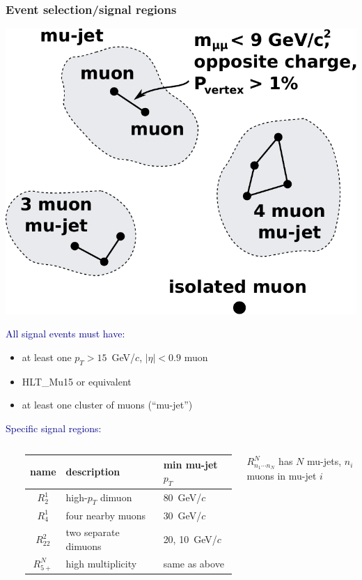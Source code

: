 \documentclass[compress]{beamer}
\begin{document}
\begin{frame}
\frametitle{Event selection/signal regions}

\vspace{0.25 cm}
\hfill \mbox{\includegraphics[width=0.37\linewidth]{closeness.pdf}\hspace{-0.6 cm}}

\vspace{-3.5 cm}
\textcolor{darkblue}{All signal events must have:}

\begin{itemize}
\item at least one $p_T > 15$~GeV/$c$, $|\eta| < 0.9$ muon
\item HLT\_Mu15 or equivalent
\item at least one cluster of muons (``mu-jet'')
\end{itemize}

\vspace{0.15 cm}
\textcolor{darkblue}{Specific signal regions:}

\vspace{0.1 cm}
\begin{columns}
\mbox{ }

\renewcommand{\arraystretch}{1.3}
\begin{tabular}{c l l}
\hline name & description & min mu-jet $p_T$ \\\hline
$R^1_2$ & high-$p_T$ dimuon & 80~GeV/$c$ \\
$R^1_4$ & four nearby muons & 30~GeV/$c$ \\
$R^2_{22}$ & two separate \mbox{dimuons\hspace{-0.3 cm}} & 20, 10~GeV/$c$ \\
$R^N_{5+}$ & high multiplicity & same as above \\\hline
\end{tabular}

\vspace{0.1 cm}
\hspace{0.2 cm} $R^N_{n_1 \cdots n_N}$ has $N$ mu-jets, $n_i$ muons in mu-jet $i$


\end{columns}
\end{frame}
\end{document}
